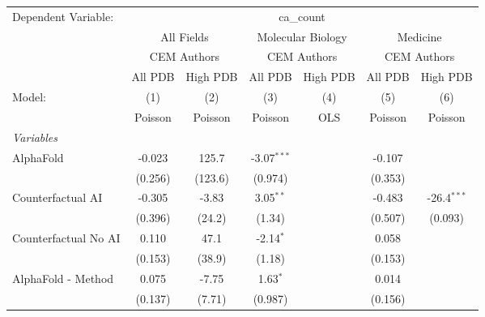 \begingroup
\centering
\begin{tabular}{lcccccc}
   \tabularnewline \midrule \midrule
   Dependent Variable: & \multicolumn{6}{c}{ca\_count}\\
 & \multicolumn{2}{c}{All Fields} & \multicolumn{2}{c}{Molecular Biology} & \multicolumn{2}{c}{Medicine} \\
\cmidrule(lr){2-3} \cmidrule(lr){4-5} \cmidrule(lr){6-7}
 & \multicolumn{2}{c}{CEM Authors} & \multicolumn{2}{c}{CEM Authors} & \multicolumn{2}{c}{CEM Authors} \\
\cmidrule(lr){2-3} \cmidrule(lr){4-5} \cmidrule(lr){6-7}
 & \multicolumn{1}{c}{All PDB} & \multicolumn{1}{c}{High PDB} & \multicolumn{1}{c}{All PDB} & \multicolumn{1}{c}{High PDB} & \multicolumn{1}{c}{All PDB} & \multicolumn{1}{c}{High PDB} \\
\cmidrule(lr){2-2} \cmidrule(lr){3-3} \cmidrule(lr){4-4} \cmidrule(lr){5-5} \cmidrule(lr){6-6} \cmidrule(lr){7-7}
   Model:                                                     & (1)        & (2)     & (3)           & (4)  & (5)     & (6)\\  
                                                              &  Poisson   & Poisson & Poisson       & OLS  & Poisson & Poisson\\  
   \midrule
   \emph{Variables}\\
   AlphaFold                                                  & -0.023     & 125.7   & -3.07$^{***}$ &      & -0.107  &   \\   
                                                              & (0.256)    & (123.6) & (0.974)       &      & (0.353) &   \\   
   Counterfactual AI                                          & -0.305     & -3.83   & 3.05$^{**}$   &      & -0.483  & -26.4$^{***}$\\   
                                                              & (0.396)    & (24.2)  & (1.34)        &      & (0.507) & (0.093)\\   
   Counterfactual No AI                                       & 0.110      & 47.1    & -2.14$^{*}$   &      & 0.058   &   \\   
                                                              & (0.153)    & (38.9)  & (1.18)        &      & (0.153) &   \\   
   AlphaFold - Method                                         & 0.075      & -7.75   & 1.63$^{*}$    &      & 0.014   &   \\   
                                                              & (0.137)    & (7.71)  & (0.987)       &      & (0.156) &   \\   

\end{tabular}
